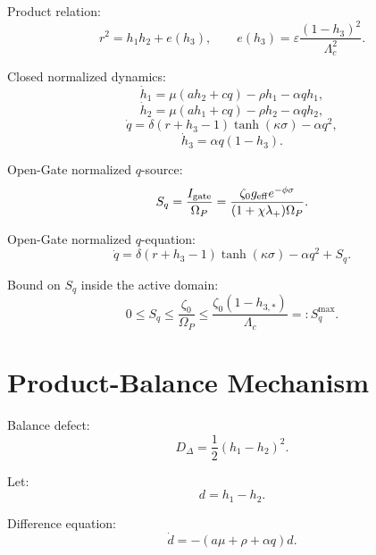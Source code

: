 \documentclass[11pt,a4paper]{article}
\newcommand{\Igate}{I_{\rm gate}}
\newcommand{\Sq}{S_q}
\newcommand{\Om}{\Omega_P}
\theoremstyle{remark}
\begin{document}
Product relation:
\begin{equation}
  r^2=h_1h_2+e(h_3),
  \qquad
  e(h_3)=\varepsilon\frac{(1-h_3)^2}{\Lambda_c^2}.
\end{equation}

Closed normalized dynamics:
\begin{equation}
  \dot h_1=\mu(ah_2+cq)-\rho h_1-\alpha qh_1,
\end{equation}
\begin{equation}
  \dot h_2=\mu(ah_1+cq)-\rho h_2-\alpha qh_2,
\end{equation}
\begin{equation}
  \dot q=\delta(r+h_3-1)\tanh(\kappa\sigma)-\alpha q^2,
\end{equation}
\begin{equation}
  \dot h_3=\alpha q(1-h_3).
\end{equation}

Open-Gate normalized $q$-source:
\begin{equation}
  \Sq=\frac{\Igate}{\Om}
  =\frac{\zeta_0g_{\rm eff}e^{-\phi\sigma}}
  {(1+\chi\lambda_+)\Om}.
\end{equation}

Open-Gate normalized $q$-equation:
\begin{equation}
  \dot q=\delta(r+h_3-1)\tanh(\kappa\sigma)-\alpha q^2+\Sq.
\end{equation}

Bound on $S_q$ inside the active domain:
\begin{equation}
  0\le \Sq\le \frac{\zeta_0}{\Om}
  \le \frac{\zeta_0(1-h_{3,*})}{\Lambda_c}
  =:S_q^{\max}.
\end{equation}

\section{Product-Balance Mechanism}

Balance defect:
\begin{equation}
  D_\Delta=\frac12(h_1-h_2)^2.
\end{equation}

Let:
\begin{equation}
  d=h_1-h_2.
\end{equation}

Difference equation:
\begin{equation}
  \dot d=-(a\mu+\rho+\alpha q)d.
\end{equation}
\end{document}
